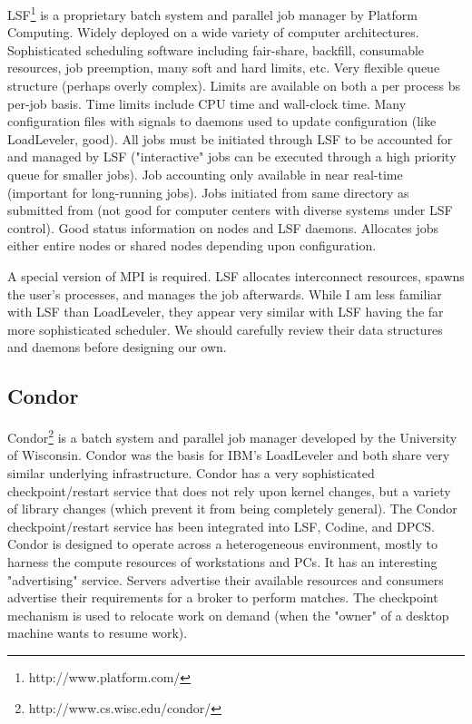 LSF\footnote{http://www.platform.com/}
is a proprietary batch system and parallel job manager by 
Platform Computing. Widely deployed on a wide variety of computer 
architectures. Sophisticated scheduling software including 
fair-share, backfill, consumable resources, job preemption, many soft 
and hard limits, etc. Very flexible queue structure (perhaps overly 
complex). Limits are available on both a per process bs per-job  
basis. Time limits include CPU time and wall-clock time. Many 
configuration files with signals to daemons used to update 
configuration (like LoadLeveler, good). All jobs must be initiated 
through LSF to be accounted for and managed by LSF ("interactive" 
jobs can be executed through a high priority queue for 
smaller jobs). Job accounting only available in near real-time (important 
for long-running jobs). Jobs initiated from same directory as 
submitted from (not good for computer centers with diverse systems 
under LSF control). Good status information on nodes and LSF daemons. 
Allocates jobs either entire nodes or shared nodes depending upon 
configuration.

A special version of MPI is required. LSF allocates interconnect 
resources, spawns the user's processes, and manages the job 
afterwards. While I am less familiar with LSF than LoadLeveler, they 
appear very similar with LSF having the far more sophisticated 
scheduler. We should carefully review their data structures and 
daemons before designing our own.


\subsection{Condor}


Condor\footnote{http://www.cs.wisc.edu/condor/} is a
batch system and parallel job manager 
developed by the University of Wisconsin. 
Condor was the basis for IBM's LoadLeveler and both share very similar 
underlying infrastructure. Condor has a very sophisticated checkpoint/restart 
service that does not rely upon kernel changes, but a variety of 
library changes (which prevent it from being completely general). The 
Condor checkpoint/restart service has been integrated into LSF, 
Codine, and DPCS. Condor is designed to operate across a 
heterogeneous environment, mostly to harness the compute resources of 
workstations and PCs. It has an interesting "advertising" service. 
Servers advertise their available resources and consumers advertise 
their requirements for a broker to perform matches. The checkpoint 
mechanism is used to relocate work on demand (when the "owner" of a 
desktop machine wants to resume work).



